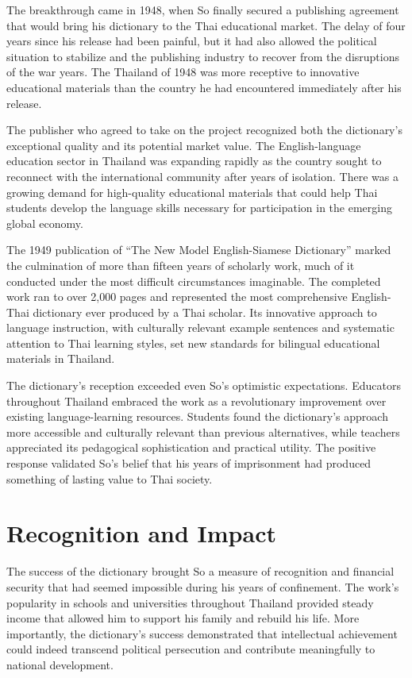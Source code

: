 \documentclass[
  Letterpaper,
]{scrbook}
\begin{document}
The breakthrough came in 1948, when So finally secured a publishing
agreement that would bring his dictionary to the Thai educational
market. The delay of four years since his release had been painful, but
it had also allowed the political situation to stabilize and the
publishing industry to recover from the disruptions of the war years.
The Thailand of 1948 was more receptive to innovative educational
materials than the country he had encountered immediately after his
release.

The publisher who agreed to take on the project recognized both the
dictionary's exceptional quality and its potential market value. The
English-language education sector in Thailand was expanding rapidly as
the country sought to reconnect with the international community after
years of isolation. There was a growing demand for high-quality
educational materials that could help Thai students develop the language
skills necessary for participation in the emerging global economy.

The 1949 publication of ``The New Model English-Siamese Dictionary''
marked the culmination of more than fifteen years of scholarly work,
much of it conducted under the most difficult circumstances imaginable.
The completed work ran to over 2,000 pages and represented the most
comprehensive English-Thai dictionary ever produced by a Thai scholar.
Its innovative approach to language instruction, with culturally
relevant example sentences and systematic attention to Thai learning
styles, set new standards for bilingual educational materials in
Thailand.

The dictionary's reception exceeded even So's optimistic expectations.
Educators throughout Thailand embraced the work as a revolutionary
improvement over existing language-learning resources. Students found
the dictionary's approach more accessible and culturally relevant than
previous alternatives, while teachers appreciated its pedagogical
sophistication and practical utility. The positive response validated
So's belief that his years of imprisonment had produced something of
lasting value to Thai society.

\section{Recognition and Impact}\label{recognition-and-impact}

The success of the dictionary brought So a measure of recognition and
financial security that had seemed impossible during his years of
confinement. The work's popularity in schools and universities
throughout Thailand provided steady income that allowed him to support
his family and rebuild his life. More importantly, the dictionary's
success demonstrated that intellectual achievement could indeed
transcend political persecution and contribute meaningfully to national
development.
\end{document}
